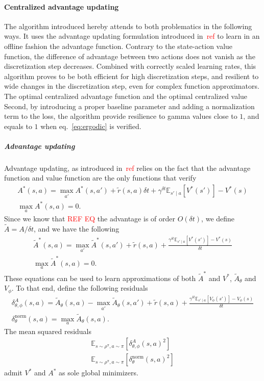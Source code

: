 \documentclass[11pt]{article}
\newcommand{\deltat}{{\delta t}}
\newcommand{\E}{\mathbb{E}}
\newcommand{\TODO}[1]{\textcolor{red}{#1}}
\begin{document}
\paragraph{Centralized advantage updating}
The algorithm introduced hereby attends to both problematics in the following ways.
It uses the advantage updating formulation introduced in~\TODO{ref} to learn
in an offline fashion the advantage function. Contrary to the state-action value
function, the difference of advantage between two actions does not vanish as the
discretization step decreases. Combined with correctly scaled learning rates, this
algorithm proves to be both efficient for high discretization steps, and resilient
to wide changes in the discretization step, even for complex function approximators.
The optimal centralized advantage function and the optimal centralized value
Second, by introducing a proper baseline parameter and adding a normalization term
to the loss, the algorithm provide resilience to gamma values close to $1$, and
equals to $1$ when eq.~\eqref{eq:ergodic} is verified.
\subparagraph{Advantage updating}
Advantage updating, as introduced in~\TODO{ref} relies on the fact that the advantage
function and value function are the only functions that verify
\begin{gather}
	A^*(s, a) = \max\limits_{a'} A^*(s, a') + 
		\tilde{r}(s, a)\deltat
		 + 
		\gamma^\deltat \E_{s'\mid a}\left[
			V^*(s')
		\right] - V^*(s) \\
	\max\limits_{a} A^*(s, a) = 0.
      \end{gather}
Since we know that \TODO{REF EQ} the advantage is of order $O(\deltat)$, we define $\tilde{A} = A/\deltat$, and we have the following
      \begin{gather}
	\tilde{A}^*(s, a) = \max\limits_{a'} \tilde{A}^*(s, a') + 
		\tilde{r}(s, a)
		 + 
		\frac{\gamma^\deltat \E_{s'\mid a}\left[
			V^*(s')
		\right] - V^*(s)
		}{
		\deltat
	}\\
	\max\limits_{a} \tilde{A}^*(s, a) = 0.
\end{gather}
These equations can be used to learn approximations of both $\tilde{A}^*$ and $V^*$,
$\tilde{A}_\theta$ and $V_\phi$. To that end, define the following residuals
\begin{gather}
	\delta^A_{\theta, \phi}(s, a) = \tilde{A}_\theta(s, a) -
	\max\limits_{a'} \tilde{A}_\theta(s, a') + 
	\tilde{r}(s, a)
	+ 
	\frac{\gamma^\deltat \E_{s'\mid a}\left[
			V_\phi(s')
		\right] - V_\phi(s)
		}{
		\deltat
	}\\
	\delta^\text{norm}_\theta(s, a) = \max\limits_{a} \tilde{A}_\theta(s, a).
\end{gather}
The mean squared residuals
\begin{align}
	\E_{s \sim \rho^\pi, a \sim \pi}\left[\delta^A_{\theta, \phi}(s, a)^2\right]\\
	\E_{s \sim \rho^\pi, a \sim \pi}\left[\delta^\text{norm}_{\theta}(s, a)^2\right]
\end{align}
admit $V^*$ and $A^*$ as sole global minimizers.
\end{document}
